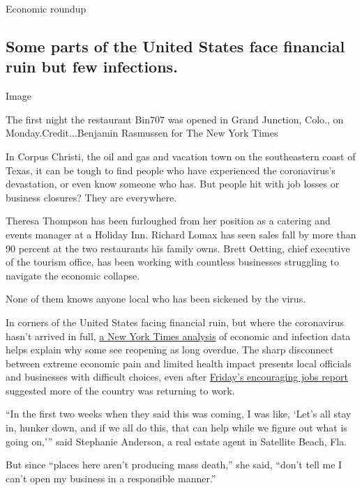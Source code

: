 Economic roundup

\hypertarget{some-parts-of-the-united-states-face-financial-ruin-but-few-infections}{%
\subsection{Some parts of the United States face financial ruin but few
infections.}\label{some-parts-of-the-united-states-face-financial-ruin-but-few-infections}}

Image

The first night the restaurant Bin707 was opened in Grand Junction,
Colo., on Monday.Credit...Benjamin Rasmussen for The New York Times

In Corpus Christi, the oil and gas and vacation town on the southeastern
coast of Texas, it can be tough to find people who have experienced the
coronavirus's devastation, or even know someone who has. But people hit
with job losses or business closures? They are everywhere.

Theresa Thompson has been furloughed from her position as a catering and
events manager at a Holiday Inn. Richard Lomax has seen sales fall by
more than 90 percent at the two restaurants his family owns. Brett
Oetting, chief executive of the tourism office, has been working with
countless businesses struggling to navigate the economic collapse.

None of them knows anyone local who has been sickened by the virus.

In corners of the United States facing financial ruin, but where the
coronavirus hasn't arrived in full,
\href{https://www.nytimes3xbfgragh.onion/interactive/2020/06/06/business/economy/high-unemployment-few-coronavirus-cases.html}{a
New York Times analysis} of economic and infection data helps explain
why some see reopening as long overdue. The sharp disconnect between
extreme economic pain and limited health impact presents local officials
and businesses with difficult choices, even after
\href{https://www.nytimes3xbfgragh.onion/2020/06/05/business/economy/jobs-report.html}{Friday's
encouraging jobs report} suggested more of the country was returning to
work.

``In the first two weeks when they said this was coming, I was like,
`Let's all stay in, hunker down, and if we all do this, that can help
while we figure out what is going on,''' said Stephanie Anderson, a real
estate agent in Satellite Beach, Fla.

But since ``places here aren't producing mass death,'' she said, ``don't
tell me I can't open my business in a responsible manner.''

